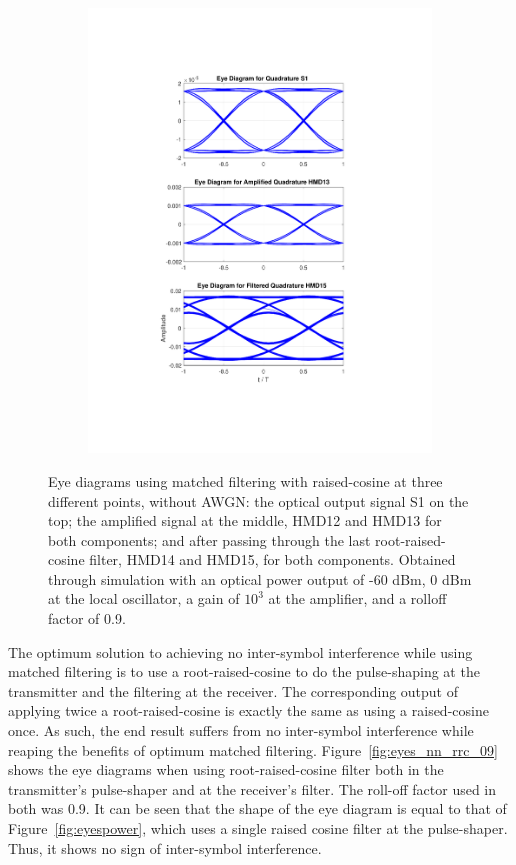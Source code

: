 \begin{figure}[H]
\begin{subfigure}{.45\textwidth}
		\includegraphics[clip, trim=5cm 4cm 5cm 4cm,
			width=\textwidth]{./sdf/m_qam_system/figures/eyes/q_nn_p_60_09_rc.pdf}
	\end{subfigure}
	
	\caption{Eye diagrams using matched filtering with raised-cosine at
		three different points, without AWGN: the optical output signal S1 on the top;
		the amplified signal at the middle, HMD12 and HMD13 for both components; and
		after passing through the last root-raised-cosine filter, HMD14 and HMD15, for
		both components. Obtained through simulation with an optical power output of
		-60 dBm, 0 dBm at the local oscillator, a gain of $10^3$ at the amplifier, and
		a rolloff factor of 0.9.\label{fig:eyes_nn_rc_09}}
	
\end{figure}

The optimum solution to achieving no inter-symbol interference while using
matched filtering is to use a root-raised-cosine to do the pulse-shaping at the
transmitter and the filtering at the receiver. The corresponding output of
applying twice a root-raised-cosine is exactly the same as using a
raised-cosine once. As such, the end result suffers from no inter-symbol
interference while reaping the benefits of optimum matched filtering.
Figure~\ref{fig:eyes_nn_rrc_09} shows the eye diagrams when using
root-raised-cosine filter both in the transmitter's pulse-shaper and at the
receiver's filter. The roll-off factor used in both was 0.9. It can be seen
that the shape of the eye diagram is equal to that of
Figure~\ref{fig:eyespower}, which uses a single raised cosine filter at the
pulse-shaper. Thus, it shows no sign of inter-symbol interference.

